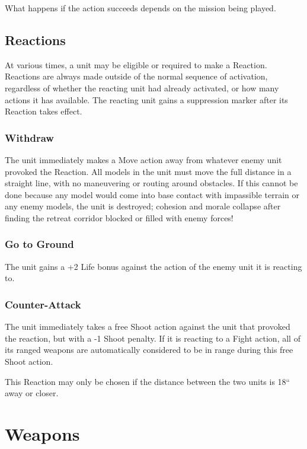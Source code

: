 \begin{multicols}{2}
What happens if the action succeeds depends on the mission being played.




\section*{Reactions}
At various times, a unit may be eligible or required to make a Reaction. Reactions are always made outside of the normal sequence of activation, regardless of whether the reacting unit had already activated, or how many actions it has available. The reacting unit gains a suppression marker after its Reaction takes effect.



\subsection*{Withdraw}
The unit immediately makes a Move action away from whatever enemy unit provoked the Reaction. All models in the unit must move the full distance in a straight line, with no maneuvering or routing around obstacles. If this cannot be done because any model would come into base contact with impassible terrain or any enemy models, the unit is destroyed; cohesion and morale collapse after finding the retreat corridor blocked or filled with enemy forces!



\subsection*{Go to Ground}
The unit gains a +2 Life bonus against the action of the enemy unit it is reacting to.



\subsection*{Counter-Attack}
The unit immediately takes a free Shoot action against the unit that provoked the reaction, but with a -1 Shoot penalty. If it is reacting to a Fight action, all of its ranged weapons are automatically considered to be in range during this free Shoot action.

This Reaction may only be chosen if the distance between the two units is 18`` away or closer.




\chapter*{Weapons}


\end{multicols}
